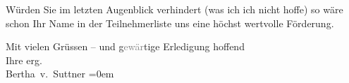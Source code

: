 \pstart
           Würden Sie im letzten Augenblick verhindert (was ich ich nicht hoffe) so wäre schon
               Ihr Name in der Teilnehmerliste uns eine höchst wertvolle Förderung.\pend
           
\pstart
           Mit vielen Grüssen – und g\textcolor{gray}{ewär}tige Erledigung
               hoffend{\\[\baselineskip]}Ihre erg.{\\[\baselineskip]}\spacefill\mbox{Bertha v. Suttner}\pend
           \leftskip=0em{}\endnumbering{}  
      
